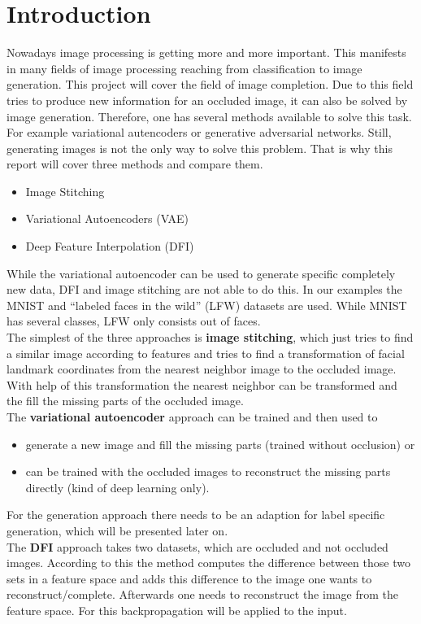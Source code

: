 \documentclass[
     11pt,         %
     a4paper,      %
     oneside,
     ]{article}
\begin{document}
\section{Introduction}
Nowadays image processing is getting more and more important. This manifests in many fields of image processing reaching from classification to image generation.
This project will cover the field of image completion. Due to this field tries to produce new information for an occluded image, it can also be solved by image generation.
Therefore, one has several methods available to solve this task. For example variational autencoders or generative adversarial networks. Still, generating images is not the only way to solve this problem. That is why this report will cover three methods and compare them.
\begin{itemize}
  \item Image Stitching
  \item Variational Autoencoders (VAE)
  \item Deep Feature Interpolation (DFI)
\end{itemize}
While the variational autoencoder can be used to generate specific completely new data, DFI and image stitching are not able to do this.
In our examples the MNIST and \enquote{labeled faces in the wild} (LFW) datasets are used. While MNIST has several classes, LFW only consists out of faces. \\
The simplest of the three approaches is \textbf{image stitching}, which just tries to find a similar image according to features and tries to find a transformation of facial landmark coordinates from the nearest neighbor image to the occluded image. With help of this transformation the nearest neighbor can be transformed and the fill the missing parts of the occluded image.\\
The \textbf{variational autoencoder} approach can be trained and then used to
\begin{itemize}
  \item generate a new image and fill the missing parts (trained without occlusion) or
  \item can be trained with the occluded images to reconstruct the missing parts directly (kind of deep learning only).
\end{itemize}
For the generation approach there needs to be an adaption for label specific generation, which will be presented later on. \\
The \textbf{DFI} approach takes two datasets, which are occluded and not occluded images. According to this the method computes the difference between those two sets in a feature space and adds this difference to the image one wants to reconstruct/complete. Afterwards one needs to reconstruct the image from the feature space. For this backpropagation will be applied to the input.
\end{document}
